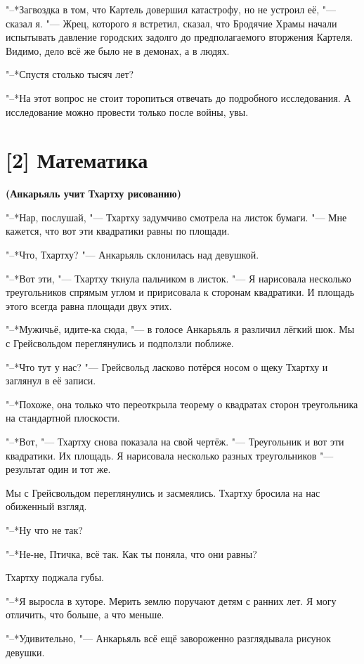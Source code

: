 "--*Загвоздка в том, что Картель довершил катастрофу, но не устроил её, "--- сказал я.
"--- Жрец, которого я встретил, сказал, что Бродячие Храмы начали испытывать давление городских задолго до предполагаемого вторжения Картеля.
Видимо, дело всё же было не в демонах, а в людях.

"--*Спустя столько тысяч лет?

"--*На этот вопрос не стоит торопиться отвечать до подробного исследования.
А исследование можно провести только после войны, увы.

\section{[2] Математика}

\textbf{(Анкарьяль учит Тхартху рисованию)}

"--*Нар, послушай, "--- Тхартху задумчиво смотрела на листок бумаги.
"--- Мне кажется, что вот эти квадратики равны по площади.

"--*Что, Тхартху? "--- Анкарьяль склонилась над девушкой.

"--*Вот эти, "--- Тхартху ткнула пальчиком в листок.
"--- Я нарисовала несколько треугольников с\ldotst прямым углом и пририсовала к сторонам квадратики.
И площадь этого всегда равна площади двух этих.

"--*Мужичьё, идите-ка сюда, "--- в голосе Анкарьяль я различил лёгкий шок.
Мы с Грейсвольдом переглянулись и подползли поближе.

"--*Что тут у нас? "--- Грейсвольд ласково потёрся носом о щеку Тхартху и заглянул в её записи.

"--*Похоже, она только что переоткрыла теорему о квадратах сторон треугольника на стандартной плоскости.

"--*Вот, "--- Тхартху снова показала на свой чертёж.
"--- Треугольник и вот эти квадратики.
Их площадь.
Я нарисовала несколько разных треугольников "--- результат один и тот же.

Мы с Грейсвольдом переглянулись и засмеялись.
Тхартху бросила на нас обиженный взгляд.

"--*Ну что не так?

"--*Не-не, Птичка, всё так.
Как ты поняла, что они равны?

Тхартху поджала губы.

"--*Я выросла в хуторе.
Мерить землю поручают детям с ранних лет.
Я могу отличить, что больше, а что меньше.

"--*Удивительно, "--- Анкарьяль всё ещё завороженно разглядывала рисунок девушки.

